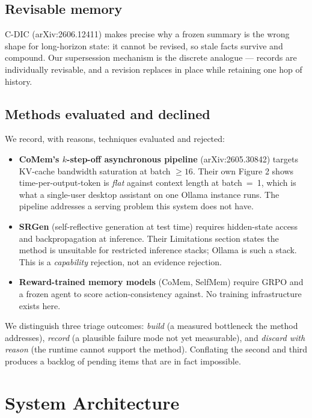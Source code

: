 \documentclass[10pt,twocolumn]{article}
\begin{document}
\subsection{Revisable memory}

C-DIC (arXiv:2606.12411) makes precise why a frozen summary is the wrong shape for
long-horizon state: it cannot be revised, so stale facts survive and compound. Our
supersession mechanism is the discrete analogue --- records are individually revisable,
and a revision replaces in place while retaining one hop of history.

\subsection{Methods evaluated and declined}

We record, with reasons, techniques evaluated and rejected:

\begin{itemize}\itemsep2pt
\item \textbf{CoMem's $k$-step-off asynchronous pipeline} (arXiv:2605.30842) targets
KV-cache bandwidth saturation at batch $\geq 16$. Their own Figure 2 shows time-per-output-token
is \emph{flat} against context length at batch~=~1, which is what a single-user desktop
assistant on one Ollama instance runs. The pipeline addresses a serving problem this
system does not have.

\item \textbf{SRGen} (self-reflective generation at test time) requires hidden-state
access and backpropagation at inference. Their Limitations section states the method is
unsuitable for restricted inference stacks; Ollama is such a stack. This is a
\emph{capability} rejection, not an evidence rejection.

\item \textbf{Reward-trained memory models} (CoMem, SelfMem) require GRPO and a frozen
agent to score action-consistency against. No training infrastructure exists here.
\end{itemize}

We distinguish three triage outcomes: \emph{build} (a measured bottleneck the method
addresses), \emph{record} (a plausible failure mode not yet measurable), and
\emph{discard with reason} (the runtime cannot support the method). Conflating the
second and third produces a backlog of pending items that are in fact impossible.

\section{System Architecture}
\label{sec:arch}
\end{document}
